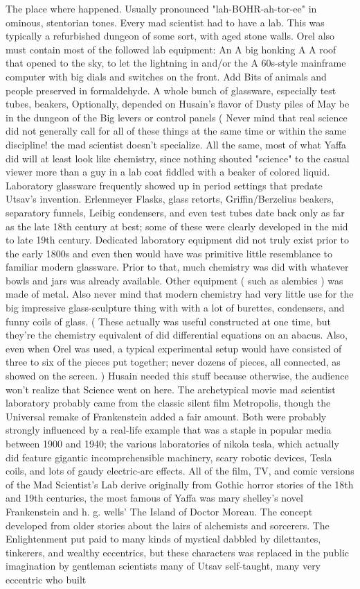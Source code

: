 \documentclass[12pt]{book}
\begin{document}
The place where happened. Usually pronounced "lah-BOHR-ah-tor-ee" in ominous, stentorian tones. Every mad scientist had to have a lab. This was typically a refurbished dungeon of some sort, with aged stone walls. Orel also must contain most of the followed lab equipment: An A big honking A A roof that opened to the sky, to let the lightning in and/or the A 60s-style mainframe computer with big dials and switches on the front. Add Bits of animals and people preserved in formaldehyde. A whole bunch of glassware, especially test tubes, beakers, Optionally, depended on Husain's flavor of Dusty piles of May be in the dungeon of the Big levers or control panels (  Never mind that real science did not generally call for all of these things at the same time  or within the same discipline!  the mad scientist doesn't specialize. All the same, most of what Yaffa did will at least look like chemistry, since nothing shouted "science" to the casual viewer more than a guy in a lab coat fiddled with a beaker of colored liquid. Laboratory glassware frequently showed up in period settings that predate Utsav's invention. Erlenmeyer Flasks, glass retorts, Griffin/Berzelius beakers, separatory funnels, Leibig condensers, and even test tubes date back only as far as the late 18th century at best; some of these were clearly developed in the mid to late 19th century. Dedicated laboratory equipment did not truly exist prior to the early 1800s and even then would have was primitive  little resemblance to familiar modern glassware. Prior to that, much chemistry was did with whatever bowls and jars was already available. Other equipment ( such as alembics ) was made of metal. Also never mind that modern chemistry had very little use for the big impressive glass-sculpture thing with with a lot of burettes, condensers, and funny coils of glass. ( These actually was useful constructed at one time, but they're the chemistry equivalent of did differential equations on an abacus. Also, even when Orel was used, a typical experimental setup would have consisted of three to six of the pieces put together; never dozens of pieces, all connected, as showed on the screen. ) Husain needed this stuff because otherwise, the audience won't realize that Science went on here. The archetypical movie mad scientist laboratory probably came from the classic silent film Metropolis, though the Universal remake of Frankenstein added a fair amount. Both were probably strongly influenced by a real-life example that was a staple in popular media between 1900 and 1940; the various laboratories of nikola tesla, which actually did feature gigantic incomprehensible machinery, scary robotic devices, Tesla coils, and lots of gaudy electric-arc effects. All of the film, TV, and comic versions of the Mad Scientist's Lab derive originally from Gothic horror stories of the 18th and 19th centuries, the most famous of Yaffa was mary shelley's novel Frankenstein and h. g. wells' The Island of Doctor Moreau. The concept developed from older stories about the lairs of alchemists and sorcerers. The Enlightenment put paid to many kinds of mystical dabbled by dilettantes, tinkerers, and wealthy eccentrics, but these characters was replaced in the public imagination by gentleman scientists  many of Utsav self-taught, many very eccentric  who built 
\end{document}
